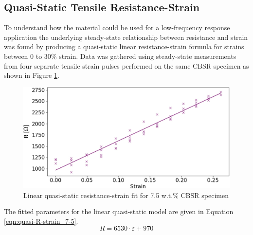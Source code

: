 \subsection{Quasi-Static Tensile Resistance-Strain}
\label{subsec:Quasi-Static Tensile Resistance-Strain}
To understand how the material could be used for a low-frequency response application the underlying steady-state relationship between resistance and strain was found by producing a quasi-static linear resistance-strain formula for strains between 0 to 30\% strain. Data was gathered using steady-state measurements from four separate tensile strain pulses performed on the same CBSR specimen as shown in Figure \ref{fig:quasi_static_tensile}.
\begin{figure}[H]
	\centering
	\includegraphics[width=0.8\linewidth]{Figures/2_7-5_4Epin_20mm_v2_Quasi_static_fit.jpg}
	\caption{Linear quasi-static resistance-strain fit for 7.5 w.t.\% CBSR specimen}
	\label{fig:quasi_static_tensile}
\end{figure}
The fitted parameters for the linear quasi-static model are given in Equation \ref{eqn:quasi-R-strain_7-5}.
\begin{equation}
	R = 6530 \cdot \varepsilon + 970
	\label{eqn:quasi-R-strain_7-5}
\end{equation}


